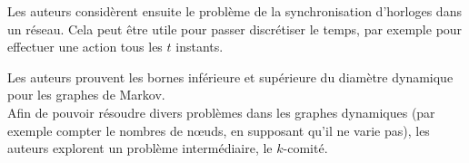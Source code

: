 \documentclass[12pt,a4paper]{article}
\begin{document}
Les auteurs considèrent ensuite le problème de la synchronisation
d'horloges dans un réseau. Cela peut être utile pour passer
discrétiser le temps, par exemple pour effectuer une action tous les
\(t\) instants.

Les auteurs prouvent les bornes inférieure et supérieure du
diamètre dynamique pour les graphes de Markov.\\

Afin de pouvoir résoudre divers problèmes dans les graphes dynamiques
(par exemple compter le nombres de nœuds, en supposant qu'il ne varie
pas), les auteurs explorent un problème intermédiaire, le
\(k\)-comité.

\printbibliography{}
\end{document}
